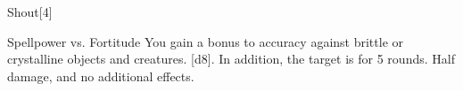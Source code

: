 \begin{spellsection}{Shout}[4]
    \begin{spellheader}
    \end{spellheader}
    \begin{spellcontent}
        \begin{spelltargetinginfo}
        \end{spelltargetinginfo}
        \begin{spelleffects}
            \begin{spellattack}{Spellpower vs. Fortitude}
                \spellspecial You gain a  bonus to accuracy against brittle or crystalline objects and creatures.
                \spellsuccess {}[d8]. In addition, the target is \deafened for 5 rounds.
                \spellfailure Half damage, and no additional effects.
            \end{spellattack}
        \end{spelleffects}
    \end{spellcontent}
    \begin{spellfooter}
        \miscastexplode
    \end{spellfooter}
    \begin{spellaugments}
    \end{spellaugments}
\end{spellsection}

